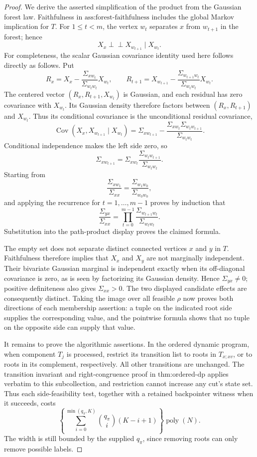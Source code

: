\documentclass{article}
\begin{document}
\begin{proof}
We derive the asserted simplification of the product from the Gaussian forest law. Faithfulness in \(\text{ass:forest-faithfulness}\) includes the global Markov implication for \(T\). For \(1\leq t<m\), the vertex \(w_t\) separates \(x\) from \(w_{t+1}\) in the forest; hence
\[
 X_x\mathbin{\perp\!\!\!\perp}X_{w_{t+1}}\mid X_{w_t}.
\]
For completeness, the scalar Gaussian covariance identity used here follows directly as follows. Put
\[
 R_x=X_x-\frac{\Sigma_{xw_t}}{\Sigma_{w_tw_t}}X_{w_t},
 \qquad
 R_{t+1}=X_{w_{t+1}}
 -\frac{\Sigma_{w_{t+1}w_t}}{\Sigma_{w_tw_t}}X_{w_t}.
\]
The centered vector \((R_x,R_{t+1},X_{w_t})\) is Gaussian, and each residual has zero covariance with \(X_{w_t}\). Its Gaussian density therefore factors between \((R_x,R_{t+1})\) and \(X_{w_t}\). Thus its conditional covariance is the unconditional residual covariance,
\[
 \operatorname{Cov}(X_x,X_{w_{t+1}}\mid X_{w_t})
 =\Sigma_{xw_{t+1}}
 -\frac{\Sigma_{xw_t}\Sigma_{w_tw_{t+1}}}{\Sigma_{w_tw_t}}.
\]
Conditional independence makes the left side zero, so
\[
 \Sigma_{xw_{t+1}}
 =\Sigma_{xw_t}
 \frac{\Sigma_{w_tw_{t+1}}}{\Sigma_{w_tw_t}}.
\]
Starting from
\[
 \frac{\Sigma_{xw_1}}{\Sigma_{xx}}
 =\frac{\Sigma_{w_1w_0}}{\Sigma_{w_0w_0}},
\]
and applying the recurrence for \(t=1,\ldots,m-1\) proves by induction that
\[
 \frac{\Sigma_{yx}}{\Sigma_{xx}}
 =\prod_{t=0}^{m-1}
 \frac{\Sigma_{w_{t+1}w_t}}{\Sigma_{w_tw_t}}.
\]
Substitution into the path-product display proves the claimed formula.

The empty set does not separate distinct connected vertices \(x\) and \(y\) in \(T\). Faithfulness therefore implies that \(X_x\) and \(X_y\) are not marginally independent. Their bivariate Gaussian marginal is independent exactly when its off-diagonal covariance is zero, as is seen by factorizing its Gaussian density. Hence \(\Sigma_{yx}\ne0\); positive definiteness also gives \(\Sigma_{xx}>0\). The two displayed candidate effects are consequently distinct. Taking the image over all feasible \(\rho\) now proves both directions of each membership assertion: a tuple on the indicated root side supplies the corresponding value, and the pointwise formula shows that no tuple on the opposite side can supply that value.

It remains to prove the algorithmic assertions. In the ordered dynamic program, when component \(T_j\) is processed, restrict its transition list to roots in \(T_{x;xv}\), or to roots in its complement, respectively. All other transitions are unchanged. The transition invariant and right-congruence proof in \(\text{thm:ordered-dp}\) applies verbatim to this subcollection, and restriction cannot increase any cut's state set. Thus each side-feasibility test, together with a retained backpointer witness when it succeeds, costs
\[
 \left\{\sum_{i=0}^{\min(q_\pi,K)}
 \binom{q_\pi}{i}(K-i+1)\right\}\operatorname{poly}(N).
\]
The width is still bounded by the supplied \(q_\pi\), since removing roots can only remove possible labels.


\end{proof}
\end{document}
